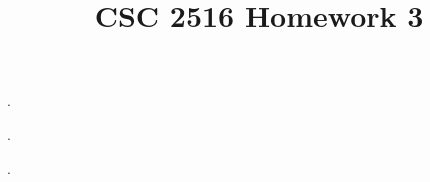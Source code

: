 \documentclass{myhw}
\title{CSC 2516 Homework 3}
\begin{document}
\begin{homeworkProblem}
.
\begin{homeworkSection}
\end{homeworkSection}
\begin{homeworkSection}
\end{homeworkSection}
\begin{homeworkSection}
\end{homeworkSection}
\end{homeworkProblem}


\begin{homeworkProblem}
.
\begin{homeworkSection}
\end{homeworkSection}
\begin{homeworkSection}
\end{homeworkSection}
\begin{homeworkSection}
\end{homeworkSection}
\end{homeworkProblem}


\begin{homeworkProblem}
.
\begin{homeworkSection}
\end{homeworkSection}
\begin{homeworkSection}
\end{homeworkSection}
\begin{homeworkSection}
\end{homeworkSection}
\end{homeworkProblem}
\end{document}
